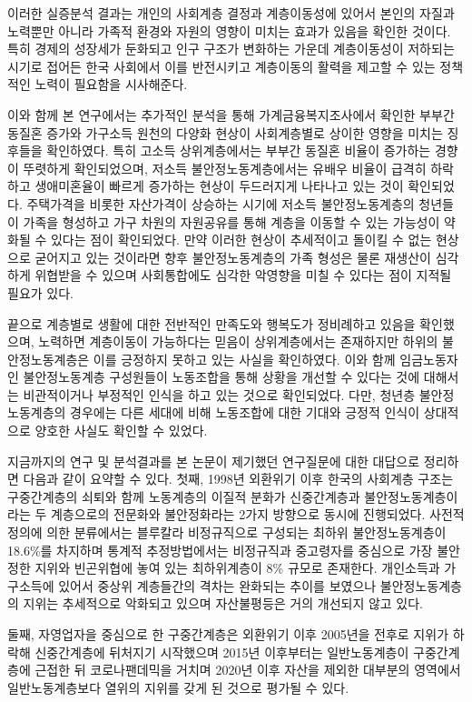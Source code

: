 \documentclass[
  letterpaper,
  DIV=11,
  numbers=noendperiod]{scrartcl}
\begin{document}
이러한 실증분석 결과는 개인의 사회계층 결정과 계층이동성에 있어서 본인의
자질과 노력뿐만 아니라 가족적 환경와 자원의 영향이 미치는 효과가 있음을
확인한 것이다. 특히 경제의 성장세가 둔화되고 인구 구조가 변화하는 가운데
계층이동성이 저하되는 시기로 접어든 한국 사회에서 이를 반전시키고
계층이동의 활력을 제고할 수 있는 정책적인 노력이 필요함을 시사해준다.

이와 함께 본 연구에서는 추가적인 분석을 통해 가계금융복지조사에서 확인한
부부간 동질혼 증가와 가구소득 원천의 다양화 현상이 사회계층별로 상이한
영향을 미치는 징후들을 확인하였다. 특히 고소득 상위계층에서는 부부간
동질혼 비율이 증가하는 경향이 뚜렷하게 확인되었으며, 저소득
불안정노동계층에서는 유배우 비율이 급격히 하락하고 생애미혼율이 빠르게
증가하는 현상이 두드러지게 나타나고 있는 것이 확인되었다. 주택가격을
비롯한 자산가격이 상승하는 시기에 저소득 불안정노동계층의 청년들이
가족을 형성하고 가구 차원의 자원공유를 통해 계층을 이동할 수 있는
가능성이 약화될 수 있다는 점이 확인되었다. 만약 이러한 현상이 추세적이고
돌이킬 수 없는 현상으로 굳어지고 있는 것이라면 향후 불안정노동계층의
가족 형성은 물론 재생산이 심각하게 위협받을 수 있으며 사회통합에도
심각한 악영향을 미칠 수 있다는 점이 지적될 필요가 있다.

끝으로 계층별로 생활에 대한 전반적인 만족도와 행복도가 정비례하고 있음을
확인했으며, 노력하면 계층이동이 가능하다는 믿음이 상위계층에서는
존재하지만 하위의 불안정노동계층은 이를 긍정하지 못하고 있는 사실을
확인하였다. 이와 함께 임금노동자인 불안정노동계층 구성원들이 노동조합을
통해 상황을 개선할 수 있다는 것에 대해서는 비관적이거나 부정적인 인식을
하고 있는 것으로 확인되었다. 다만, 청년층 불안정노동계층의 경우에는 다른
세대에 비해 노동조합에 대한 기대와 긍정적 인식이 상대적으로 양호한
사실도 확인할 수 있었다.

지금까지의 연구 및 분석결과를 본 논문이 제기했던 연구질문에 대한
대답으로 정리하면 다음과 같이 요약할 수 있다. 첫째, 1998년 외환위기 이후
한국의 사회계층 구조는 구중간계층의 쇠퇴와 함께 노동계층의 이질적 분화가
신중간계층과 불안정노동계층이라는 두 계층으로의 전문화와 불안정화라는
2가지 방향으로 동시에 진행되었다. 사전적 정의에 의한 분류에서는 블루칼라
비정규직으로 구성되는 최하위 불안정노동계층이 18.6\%를 차지하며 통계적
추정방법에서는 비정규직과 중고령자를 중심으로 가장 불안정한 지위와
빈곤위협에 놓여 있는 최하위계층이 8\% 규모로 존재한다. 개인소득과
가구소득에 있어서 중상위 계층들간의 격차는 완화되는 추이를 보였으나
불안정노동계층의 지위는 추세적으로 악화되고 있으며 자산불평등은 거의
개선되지 않고 있다.

둘째, 자영업자을 중심으로 한 구중간계층은 외환위기 이후 2005년을 전후로
지위가 하락해 신중간계층에 뒤처지기 시작했으며 2015년 이후부터는
일반노동계층이 구중간계층에 근접한 뒤 코로나팬데믹을 거치며 2020년 이후
자산을 제외한 대부분의 영역에서 일반노동계층보다 열위의 지위를 갖게 된
것으로 평가될 수 있다.
\end{document}
